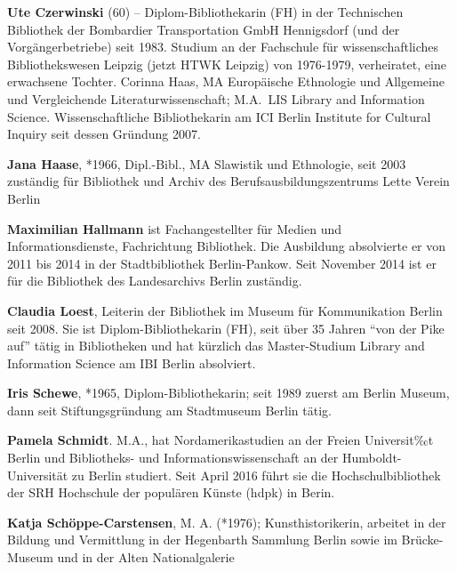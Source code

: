\documentclass[a4paper,
fontsize=11pt,
oneside,
numbers=noperiodatend,
parskip=half-,
bibliography=totoc,
final
]{scrartcl}
\begin{document}
\textbf{Ute Czerwinski} (60) -- Diplom-Bibliothekarin (FH) in der
Technischen Bibliothek der Bombardier Transportation GmbH Hennigsdorf
(und der Vorgängerbetriebe) seit 1983. Studium an der Fachschule für
wissenschaftliches Bibliothekswesen Leipzig (jetzt HTWK Leipzig) von
1976-1979, verheiratet, eine erwachsene Tochter. Corinna Haas, MA
Europäische Ethnologie und Allgemeine und Vergleichende
Literaturwissenschaft; M.A.~LIS Library and Information Science.
Wissenschaftliche Bibliothekarin am ICI Berlin Institute for Cultural
Inquiry seit dessen Gründung 2007.

\textbf{Jana Haase}, *1966, Dipl.-Bibl., MA Slawistik und Ethnologie,
seit 2003 zuständig für Bibliothek und Archiv des
Berufsausbildungszentrums Lette Verein Berlin

\textbf{Maximilian Hallmann} ist Fachangestellter für Medien und
Informationsdienste, Fachrichtung Bibliothek. Die Ausbildung absolvierte
er von 2011 bis 2014 in der Stadtbibliothek Berlin-Pankow. Seit November
2014 ist er für die Bibliothek des Landesarchivs Berlin zuständig.

\textbf{Claudia Loest}, Leiterin der Bibliothek im Museum für
Kommunikation Berlin seit 2008. Sie ist Diplom-Bibliothekarin (FH), seit
über 35 Jahren ``von der Pike auf'' tätig in Bibliotheken und hat
kürzlich das Master-Studium Library and Information Science am IBI
Berlin absolviert.

\textbf{Iris Schewe}, *1965, Diplom-Bibliothekarin; seit 1989 zuerst am
Berlin Museum, dann seit Stiftungsgründung am Stadtmuseum Berlin tätig.

\textbf{Pamela Schmidt}. M.A., hat Nordamerikastudien an der Freien
Universit‰t Berlin und Bibliotheks- und Informationswissenschaft an der
Humboldt-Universität zu Berlin studiert. Seit April 2016 führt sie die
Hochschulbibliothek der SRH Hochschule der populären Künste (hdpk) in
Berin.

\textbf{Katja Schöppe-Carstensen}, M. A. (*1976); Kunsthistorikerin,
arbeitet in der Bildung und Vermittlung in der Hegenbarth Sammlung
Berlin sowie im Brücke-Museum und in der Alten Nationalgalerie
\end{document}
